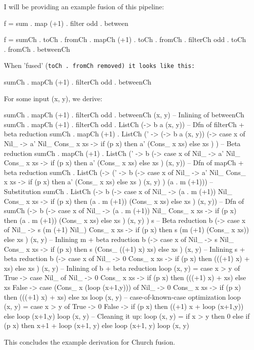 I will be providing an example fusion of this pipeline:
\begin{spec}
f = sum . map (+1) . filter odd . between

f =	     sumCh        . toCh .
fromCh . mapCh (+1)   . toCh .
fromCh . filterCh odd . toCh .
fromCh . betweenCh
\end{spec}
When 'fused' (\tt{toCh . fromCh} removed) it looks like this:
\begin{spec}
sumCh . mapCh (+1) . filterCh odd . betweenCh
\end{spec}
For some input (x, y), we derive:
\begin{spec}
sumCh . mapCh (+1) . filterCh odd . betweenCh (x, y)
-- Inlining of betweenCh
sumCh . mapCh (+1) . filterCh odd . ListCh (\a -> b a (x, y))
-- Dfn of filterCh + beta reduction
sumCh . mapCh (+1) .
  ListCh (\a' ->
    (\a -> b a (x, y))
	(\x -> case x of
      Nil_ -> a' Nil_
      Cons_ x xs -> if (p x) then a' (Cons_ x xs) else xs
    )
  )
-- Beta reduction
sumCh . mapCh (+1) .
  ListCh (\a' ->
    b (\x -> case x of
      Nil_ -> a' Nil_
      Cons_ x xs -> if (p x) then a' (Cons_ x xs) else xs
    )
	(x, y))
-- Dfn of mapCh + beta reduction
sumCh . ListCh (\a ->
  (\a' ->
    b (\x -> case x of
      Nil_ -> a' Nil_
      Cons_ x xs -> if (p x) then a' (Cons_ x xs) else xs
    )
	(x, y)
  )
  (a . m (+1)))
-- Substitution
sumCh . ListCh (\a ->
  b (\x -> case x of
    Nil_ -> (a . m (+1)) Nil_
    Cons_ x xs -> if (p x) then (a . m (+1)) (Cons_ x xs) else xs
  )
  (x, y))
-- Dfn of sumCh
(\a ->
  b (\x -> case x of
    Nil_ -> (a . m (+1)) Nil_
    Cons_ x xs -> if (p x) then (a . m (+1)) (Cons_ x xs) else xs
  )
  (x, y)
) s
-- Beta reduction
b (\x -> case x of
  Nil_ -> s (m (+1) Nil_)
  Cons_ x xs -> if (p x) then s (m (+1) (Cons_ x xs)) else xs
) (x, y)
-- Inlining m + beta reduction
b (\x -> case x of
  Nil_ -> s Nil_
  Cons_ x xs -> if (p x) then s (Cons_ ((+1) x) xs) else xs
) (x, y)
-- Inlining s + beta reduction
b (\x -> case x of
  Nil_ -> 0
  Cons_ x xs -> if (p x) then (((+1) x) + xs) else xs
) (x, y)
-- Inlining of b + beta reduction
loop (x, y) = case x > y of
  True -> case Nil_ of
    Nil_ -> 0
    Cons_ x xs -> if (p x) then (((+1) x) + xs) else xs
  False -> case (Cons_ x (loop (x+1,y))) of
    Nil_ -> 0
    Cons_ x xs -> if (p x) then (((+1) x) + xs) else xs
loop (x, y)
-- case-of-known-case optimization
loop (x, y) = case x > y of
  True -> 0
  False -> if (p x) then ((+1) x + loop (x+1,y)) else loop (x+1,y)
loop (x, y)
-- Cleaning it up:
loop (x, y) = if x > y 
              then 0
              else if (p x)
                   then x+1 + loop (x+1, y)
		               else loop (x+1, y)
loop (x, y)
\end{spec}
This concludes the example derivation for Church fusion.
